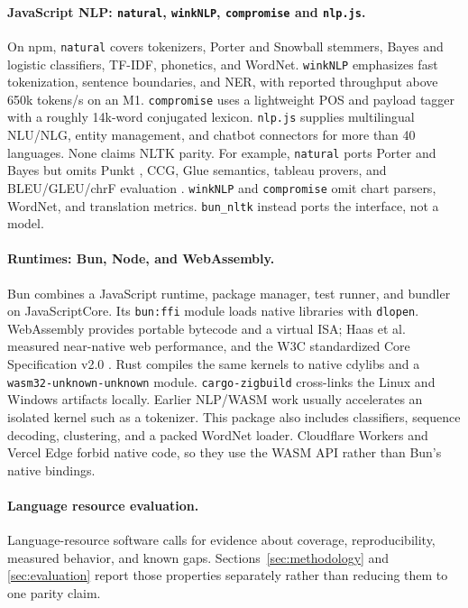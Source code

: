 \documentclass[pdflatex,sn-mathphys-num]{sn-jnl}
\theoremstyle{thmstyleone}
\begin{document}
\paragraph{JavaScript NLP: \texttt{natural}, \texttt{winkNLP}, \texttt{compromise} and \texttt{nlp.js}.}
On npm, \texttt{natural} \cite{natural2024} covers tokenizers, Porter and Snowball stemmers, Bayes and logistic classifiers, TF-IDF, phonetics, and WordNet. \texttt{winkNLP} \cite{winknlp2024} emphasizes fast tokenization, sentence boundaries, and NER, with reported throughput above 650k tokens/s on an M1. \texttt{compromise} \cite{compromise2024} uses a lightweight POS and payload tagger with a roughly 14k-word conjugated lexicon. \texttt{nlp.js} \cite{nlpjs2024} supplies multilingual NLU/NLG, entity management, and chatbot connectors for more than 40 languages. None claims NLTK parity. For example, \texttt{natural} ports Porter and Bayes but omits Punkt \cite{bird2009nltk}, CCG, Glue semantics, tableau provers, and BLEU/GLEU/chrF evaluation \cite{nltk2024}. \texttt{winkNLP} and \texttt{compromise} omit chart parsers, WordNet, and translation metrics. \texttt{bun\_nltk} instead ports the interface, not a model.

\paragraph{Runtimes: Bun, Node, and WebAssembly.}
Bun \cite{bun2024} combines a JavaScript runtime, package manager, test runner, and bundler on JavaScriptCore. Its \texttt{bun:ffi} module loads native libraries with \texttt{dlopen}. WebAssembly \cite{wasm2023} provides portable bytecode and a virtual ISA; Haas et al.\ \cite{haas2017wasm} measured near-native web performance, and the W3C standardized Core Specification v2.0 \cite{wasm2023}. Rust \cite{rust2024} compiles the same kernels to native cdylibs and a \texttt{wasm32-unknown-unknown} module. \texttt{cargo-zigbuild} cross-links the Linux and Windows artifacts locally. Earlier NLP/WASM work usually accelerates an isolated kernel such as a tokenizer. This package also includes classifiers, sequence decoding, clustering, and a packed WordNet loader. Cloudflare Workers and Vercel Edge \cite{cloudflare2024} forbid native code, so they use the WASM API rather than Bun's native bindings.

\paragraph{Language resource evaluation.}
Language-resource software calls for evidence about coverage, reproducibility, measured behavior, and known gaps. Sections~\ref{sec:methodology} and \ref{sec:evaluation} report those properties separately rather than reducing them to one parity claim.
\end{document}
